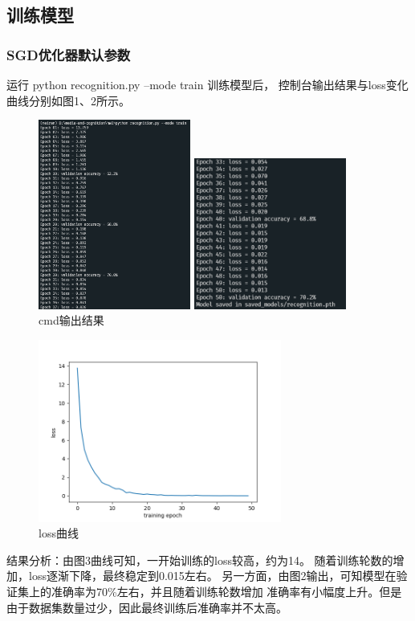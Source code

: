 \documentclass[a4paper]{article}
\begin{document}
\subsection{训练模型}
\subsubsection{SGD优化器默认参数}
运行 python recognition.py --mode train 训练模型后，
控制台输出结果与loss变化曲线分别如图1、2所示。\par
\begin{figure}[hp]
    \centering
    \begin{minipage}{0.48\textwidth}
        \centering
        \includegraphics[width=5cm]{image/train_cmd.png}
    \end{minipage}
    \begin{minipage}{0.48\textwidth}
        \centering
        \includegraphics[width=5cm]{image/train_cmd2.png}
    \end{minipage}
    \caption{cmd输出结果}
    \vspace{-1cm}
\end{figure}

\begin{figure}[hp]
    \centering
    \includegraphics[width=8cm]{image/train_figure.png}
    \caption{loss曲线}
\end{figure}
结果分析：由图3曲线可知，一开始训练的loss较高，约为14。
随着训练轮数的增加，loss逐渐下降，最终稳定到0.015左右。
另一方面，由图2输出，可知模型在验证集上的准确率为70\%左右，并且随着训练轮数增加
准确率有小幅度上升。但是由于数据集数量过少，因此最终训练后准确率并不太高。
\end{document}
